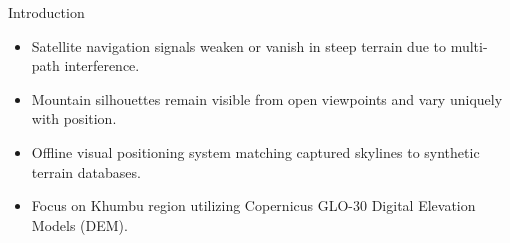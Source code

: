 \begin{frame}{Introduction}
    \begin{itemize}
        \item Satellite navigation signals weaken or vanish in steep terrain due to multi-path interference.
        \item Mountain silhouettes remain visible from open viewpoints and vary uniquely with position.
        \item Offline visual positioning system matching captured skylines to synthetic terrain databases.
        \item Focus on Khumbu region utilizing Copernicus GLO-30 Digital Elevation Models (DEM).
    \end{itemize}
\end{frame}